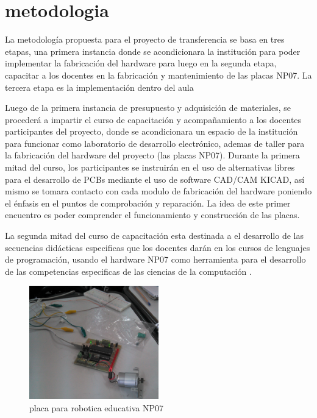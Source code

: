 \section{metodologia}

La metodología propuesta para el proyecto de transferencia se basa en tres etapas, una primera instancia donde se acondicionara la institución para poder implementar la fabricación del hardware para luego en la segunda etapa, capacitar a los docentes en la fabricación y mantenimiento de las placas NP07. La tercera etapa es la implementación dentro del aula

Luego de la primera instancia de presupuesto y adquisición de materiales, se procederá a impartir el curso de capacitación y acompañamiento a los docentes participantes del proyecto, donde se acondicionara un espacio de la institución para funcionar como laboratorio de desarrollo electrónico, ademas de taller para la fabricación del hardware del proyecto (las placas NP07). Durante la primera mitad del curso, los participantes se instruirán en el uso de alternativas libres para el desarrollo de PCBs mediante el uso de software CAD/CAM KICAD, así mismo se tomara contacto con cada modulo de fabricación del hardware poniendo el énfasis en el puntos de comprobación y reparación. La idea de este primer encuentro es poder comprender el funcionamiento y construcción de las placas.

La segunda mitad del curso de capacitación esta destinada a el desarrollo de las secuencias didácticas especificas que los docentes darán en los cursos de lenguajes de programación, usando el hardware NP07 como herramienta para el desarrollo de las competencias especificas de las ciencias de la computación \citep{sadosky2013cc}.

\begin{figure}
  \begin{center}
    \includegraphics[width=0.5\textwidth]{figuras/np07.jpg}
    \caption[Caption for LOF]{placa para robotica educativa NP07}
    
    \label{fig:placa_np07}
  \end{center}
\end{figure}

